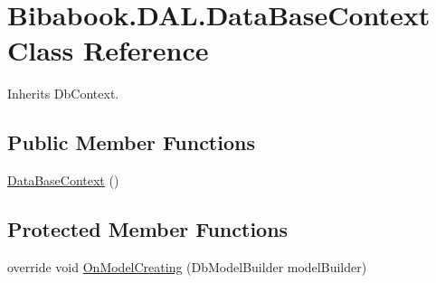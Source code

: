 \hypertarget{class_bibabook_1_1_d_a_l_1_1_data_base_context}{}\section{Bibabook.\+D\+A\+L.\+Data\+Base\+Context Class Reference}
\label{class_bibabook_1_1_d_a_l_1_1_data_base_context}


Inherits Db\+Context.

\subsection*{Public Member Functions}
\begin{DoxyCompactItemize}
\item 
\hyperlink{class_bibabook_1_1_d_a_l_1_1_data_base_context_ae695a0ee8debebee9d4a95e3a7aa8182}{Data\+Base\+Context} ()
\end{DoxyCompactItemize}
\subsection*{Protected Member Functions}
\begin{DoxyCompactItemize}
\item 
override void \hyperlink{class_bibabook_1_1_d_a_l_1_1_data_base_context_a54339e5444829acdfe69928352926252}{On\+Model\+Creating} (Db\+Model\+Builder model\+Builder)
\end{DoxyCompactItemize}
